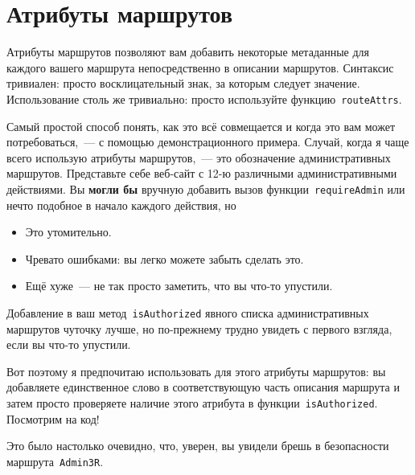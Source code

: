 \chapter{Атрибуты маршрутов}

Атрибуты маршрутов позволяют вам добавить некоторые метаданные для каждого
вашего маршрута непосредственно в описании маршрутов. Синтаксис тривиален:
просто восклицательный знак, за которым следует значение. Использование столь
же тривиально: просто используйте функцию~\lstinline'routeAttrs'.

Самый простой способ понять, как это всё совмещается и когда это вам может
потребоваться,~--- с помощью демонстрационного примера. Случай, когда я чаще
всего использую атрибуты маршрутов,~--- это обозначение административных
маршрутов. Представьте себе веб-сайт с 12-ю различными административными
действиями. Вы \textbf{могли бы} вручную добавить вызов
функции~\lstinline'requireAdmin' или нечто подобное в начало каждого действия,
но
\begin{itemize}
    \item Это утомительно.

    \item Чревато ошибками: вы легко можете забыть сделать это.

    \item Ещё хуже~--- не так просто заметить, что вы что-то упустили.
\end{itemize}

Добавление в ваш метод~\lstinline'isAuthorized' явного списка административных
маршрутов чуточку лучше, но по-прежнему трудно увидеть с первого взгляда, если
вы что-то упустили.

Вот поэтому я предпочитаю использовать для этого атрибуты маршрутов: вы
добавляете единственное слово в соответствующую часть описания маршрута и затем
просто проверяете наличие этого атрибута в функции~\lstinline'isAuthorized'.
Посмотрим на код!


Это было настолько очевидно, что, уверен, вы увидели брешь в безопасности
маршрута~\lstinline'Admin3R'.
